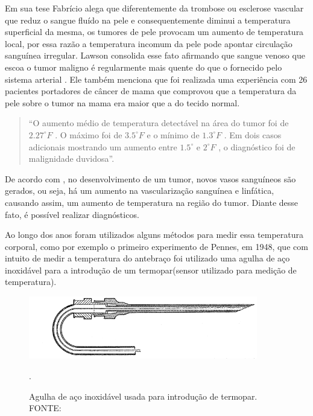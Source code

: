  Em sua tese  Fabrício \cite{Fabricio} alega que diferentemente da trombose ou esclerose vascular que reduz o sangue  fluído na pele e consequentemente diminui a temperatura superficial da mesma, os tumores de pele provocam um aumento de temperatura local, por essa razão a temperatura incomum da pele pode apontar circulação sanguínea irregular.
 Lawson\cite{Lawson} consolida esse fato afirmando que  sangue venoso que escoa o tumor maligno é regularmente mais quente  do que o fornecido pelo sistema arterial . Ele também menciona que foi realizada uma experiência com 26 pacientes portadores de câncer de mama que comprovou que a temperatura da pele sobre o tumor na mama era maior que a do tecido normal. 
    
\begin{quotation}
 ``O aumento médio de temperatura detectável na área do tumor foi de $ 2.27^{\circ}F$ . O máximo foi de $ 3.5^{\circ}F $ e o mínimo de $ 1.3^{\circ}F$ . Em dois casos adicionais mostrando um aumento entre $ 1.5^{\circ} $  e $ 2^{\circ}F$ , o diagnóstico foi de malignidade duvidosa''\cite[p.309]{Lawson}.\end{quotation}
  
  De acordo com \cite{Lawson}, no desenvolvimento de um tumor, novos vasos sanguíneos são gerados, ou seja, há um aumento  na vascularização sanguínea e linfática, causando assim, um aumento de temperatura na região do tumor.
Diante desse fato, é possível realizar diagnósticos. 
   

   
  
  Ao longo dos anos foram utilizados alguns métodos para medir essa  temperatura corporal, como por exemplo o primeiro experimento de Pennes, em 1948, que com intuito de medir a temperatura do antebraço  foi utilizado uma agulha de aço inoxidável para a introdução de um termopar(sensor utilizado para medição de temperatura).
 
 \begin{figure}[h]
\centering
\includegraphics[width=10cm]{figuras/agulha.png}
\caption{Agulha de aço inoxidável usada para introdução de termopar. FONTE: \cite{PENNES}}.
\label{figura 1:Agulha }
\end{figure}

